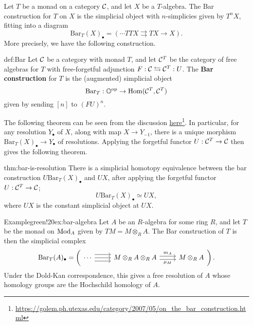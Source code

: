 Let $T$ be a monad on a category $\mathcal{C}$, and let $X$ be a $T$-algebra. The Bar construction for $T$ on $X$ is the simplicial object with $n$-simplicies given by $T^nX$, fitting into a diagram 
    \[
    \text{Bar}_T(X)_\bullet 
    = \left(
        \cdots TTX \rightrightarrows TX \to X
    \right).
    \]
More precisely, we have the following construction.

\begin{definition}{def:Bar}
    Let $\mathcal{C}$ be a category with monad $T$, and let $\mathcal{C}^T$ be the category of free algebras for $T$ with free-forgetful adjunction $F : \mathcal{C} \leftrightarrows \mathcal{C}^T : U$. The \textbf{Bar construction} for $T$ is the (augmented) simplicial object 
        \[
        \text{Bar}_T : \mathbb{O}^{\text{op}} \to \operatorname{Hom}(\mathcal{C}^T, \mathcal{C}^T)
        \]
    given by sending $[n]$ to $(FU)^n$. 
\end{definition}

The following theorem can be seen from the discussion \href{https://golem.ph.utexas.edu/category/2007/05/on_the_bar_construction.html}{here}\footnote{\url{https://golem.ph.utexas.edu/category/2007/05/on_the_bar_construction.html}}. In particular, for any resolution $Y_\bullet$ of $X$, along with map $X \to Y_{-1}$, there is a unique morphism $\text{Bar}_T(X)_\bullet \to Y_\bullet$ of resolutions. Applying the forgetful functor $U : \mathcal{C}^T \to \mathcal{C}$ then gives the following theorem. 

\begin{theorem}{thm:bar-is-resolution}
    There is a simplicial homotopy equivalence between the bar construction $U\text{Bar}_T(X)_\bullet$ and $UX$, after applying the forgetful functor $U : \mathcal{C}^T \to \mathcal{C}$;
        \[
        U\text{Bar}_T(X)_\bullet
        \simeq UX,
        \]
    where $UX$ is the constant simplicial object at $UX$. 
\end{theorem}

\begin{env}[Algebras]{Example}{green!20}{ex:bar-algebra}
    Let $A$ be an $R$-algebra for some ring $R$, and let $T$ be the monad on ${\mathrm{Mod}}_A$ given by $TM = M \otimes_R A$. The Bar construction of $T$ is then the simplicial complex 
        \[
        \text{Bar}_T(A)_\bullet =
        \left(
        \begin{tikzcd}
            \cdots 
                \arrow[r, shift left=2]
                \arrow[r]
                \arrow[r, shift right=2]
            & M \otimes_R A \otimes_R A
                \arrow[r, shift left, "m_A"]
                \arrow[r, shift right, "\mu_M"']
            & M \otimes_R A
        \end{tikzcd}
        \right).
        \]
    Under the Dold-Kan correspondence, this gives a free resolution of $A$ whose homology groups are the Hochschild homology of $A$.
\end{env}

